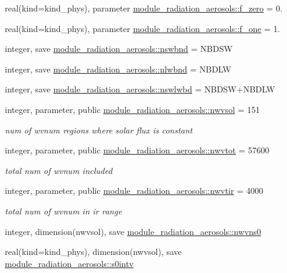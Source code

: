 \begin{DoxyCompactItemize}
real(kind=kind\+\_\+phys), parameter \hyperlink{group__module__radiation__aerosols_ga7db1adcf476a9a5532230aa11fcc3bb7}{module\+\_\+radiation\+\_\+aerosols\+::f\+\_\+zero} = 0.
\item 
real(kind=kind\+\_\+phys), parameter \hyperlink{group__module__radiation__aerosols_ga63babe7f9ec4ff6a0364993f4be3768e}{module\+\_\+radiation\+\_\+aerosols\+::f\+\_\+one} = 1.
\item 
integer, save \hyperlink{group__module__radiation__aerosols_ga1d6c41e3bb818aa8b6f8f10d1c3f38a7}{module\+\_\+radiation\+\_\+aerosols\+::nswbnd} = N\+B\+D\+SW
\item 
integer, save \hyperlink{group__module__radiation__aerosols_gab17b7f75d6d737fd2fc81eae44cba81d}{module\+\_\+radiation\+\_\+aerosols\+::nlwbnd} = N\+B\+D\+LW
\item 
integer, save \hyperlink{group__module__radiation__aerosols_gab77b3b4aa76361277d828c7ba5dc3eda}{module\+\_\+radiation\+\_\+aerosols\+::nswlwbd} = N\+B\+D\+SW+N\+B\+D\+LW
\item 
integer, parameter, public \hyperlink{group__module__radiation__aerosols_ga2e0dc6d161d1906050efd67c471673c9}{module\+\_\+radiation\+\_\+aerosols\+::nwvsol} = 151
\begin{DoxyCompactList}\small\item\em num of wvnum regions where solar flux is constant \end{DoxyCompactList}\item 
integer, parameter, public \hyperlink{group__module__radiation__aerosols_gae94df49c8ff8c0ec8e6b8adb891f3c6b}{module\+\_\+radiation\+\_\+aerosols\+::nwvtot} = 57600
\begin{DoxyCompactList}\small\item\em total num of wvnum included \end{DoxyCompactList}\item 
integer, parameter, public \hyperlink{group__module__radiation__aerosols_ga45b2c26ccba5d4fd2dfccf31bcc02824}{module\+\_\+radiation\+\_\+aerosols\+::nwvtir} = 4000
\begin{DoxyCompactList}\small\item\em total num of wvnum in ir range \end{DoxyCompactList}\item 
integer, dimension(nwvsol), save \hyperlink{group__module__radiation__aerosols_ga80194c8356dfb92a43306abbe7097711}{module\+\_\+radiation\+\_\+aerosols\+::nwvns0}
\item 
real(kind=kind\+\_\+phys), dimension(nwvsol), save \hyperlink{group__module__radiation__aerosols_gaed8bb8a8bc26d72a6c3d31ed4430941f}{module\+\_\+radiation\+\_\+aerosols\+::s0intv}

\end{DoxyCompactItemize}

